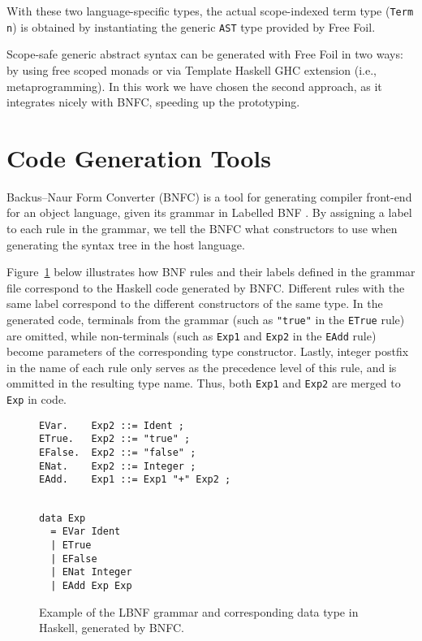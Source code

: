 With these two language-specific types, the actual scope-indexed term type (\texttt{Term n}) is obtained by instantiating the generic \texttt{AST} type provided by Free Foil.

Scope-safe generic abstract syntax can be generated with Free Foil in two ways: by using free scoped monads or via Template Haskell \cite{SheardPeytonJones2002_TH} GHC extension (i.e., metaprogramming). In this work we have chosen the second approach, as it integrates nicely with BNFC, speeding up the prototyping.

\section{Code Generation Tools}

Backus–Naur Form Converter (BNFC) \cite{BNFC} is a tool for generating compiler front-end for an object language, given its grammar in Labelled BNF \cite{BackusNaurForm2003}. By assigning a label to each rule in the grammar, we tell the BNFC what constructors to use when generating the syntax tree in the host language.

Figure~\ref{fig:lbnf-bnfc-example} below illustrates how BNF rules and their labels defined in the grammar file correspond to the Haskell code generated by BNFC. Different rules with the same label correspond to the different constructors of the same type. In the generated code, terminals from the grammar (such as \texttt{"true"} in the \texttt{ETrue} rule) are omitted, while non-terminals (such as \texttt{Exp1} and \texttt{Exp2} in the \texttt{EAdd} rule) become parameters of the corresponding type constructor. Lastly, integer postfix in the name of each rule only serves as the precedence level of this rule, and is ommitted in the resulting type name. Thus, both \texttt{Exp1} and \texttt{Exp2} are merged to \texttt{Exp} in code.

\begin{figure}[H]
  \centering%
  \begin{minipage}{0.58\textwidth-3pt}
    \begin{verbatim}
EVar.    Exp2 ::= Ident ;
ETrue.   Exp2 ::= "true" ;
EFalse.  Exp2 ::= "false" ;
ENat.    Exp2 ::= Integer ;
EAdd.    Exp1 ::= Exp1 "+" Exp2 ;
 
    \end{verbatim}
  \end{minipage}%
  \hspace{6pt}%
  \begin{minipage}{0.4\textwidth-3pt}
\begin{verbatim}
data Exp
  = EVar Ident
  | ETrue 
  | EFalse
  | ENat Integer
  | EAdd Exp Exp
\end{verbatim}
  \end{minipage}
  \caption[BNFC input and output example]{Example of the LBNF grammar and corresponding data type in Haskell, generated by BNFC.}
  \label{fig:lbnf-bnfc-example}
\end{figure}

